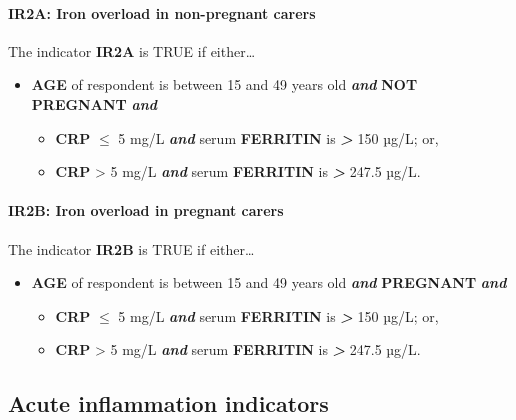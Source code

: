 \documentclass[12pt,a4paper]{article}
\let\oldparagraph\paragraph
\renewcommand{\paragraph}[1]{\oldparagraph{#1}\mbox{}}
\begin{document}
\hypertarget{ir2a-iron-overload-in-non-pregnant-carers}{%
\paragraph{IR2A: Iron overload in non-pregnant carers}\label{ir2a-iron-overload-in-non-pregnant-carers}}

The indicator \textbf{IR2A} is TRUE if either\ldots{}

\begin{itemize}
\item
  \textbf{AGE} of respondent is between 15 and 49 years old \textbf{\emph{and}} \textbf{NOT PREGNANT} \textbf{\emph{and}}

  \begin{itemize}
  \item
    \textbf{CRP} \textbf{\emph{\(\leq\)}} 5 mg/L \textbf{\emph{and}} serum \textbf{FERRITIN} is \textbf{\emph{\textgreater{}}} 150 µg/L; or,
  \item
    \textbf{CRP} \textgreater{} 5 mg/L \textbf{\emph{and}} serum \textbf{FERRITIN} is \textbf{\emph{\textgreater{}}} 247.5 µg/L.
  \end{itemize}
\end{itemize}

\hypertarget{ir2b-iron-overload-in-pregnant-carers}{%
\paragraph{IR2B: Iron overload in pregnant carers}\label{ir2b-iron-overload-in-pregnant-carers}}

The indicator \textbf{IR2B} is TRUE if either\ldots{}

\begin{itemize}
\item
  \textbf{AGE} of respondent is between 15 and 49 years old \textbf{\emph{and}} \textbf{PREGNANT} \textbf{\emph{and}}

  \begin{itemize}
  \item
    \textbf{CRP} \textbf{\emph{\(\leq\)}} 5 mg/L \textbf{\emph{and}} serum \textbf{FERRITIN} is \textbf{\emph{\textgreater{}}} 150 µg/L; or,
  \item
    \textbf{CRP} \textgreater{} 5 mg/L \textbf{\emph{and}} serum \textbf{FERRITIN} is \textbf{\emph{\textgreater{}}} 247.5 µg/L.
  \end{itemize}
\end{itemize}

\hypertarget{acute-inflammation-indicators}{%
\subsection{Acute inflammation indicators}\label{acute-inflammation-indicators}}
\end{document}
